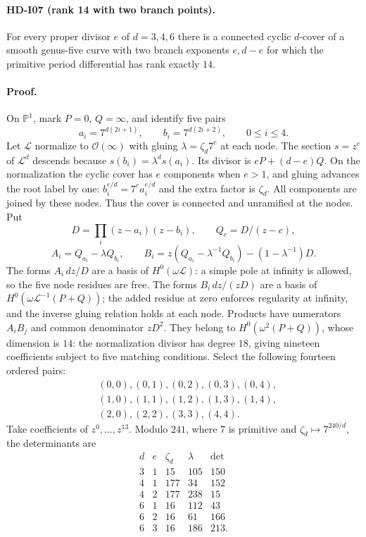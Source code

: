 \paragraph{HD-I07 (rank 14 with two branch points).}
For every proper divisor $e$ of $d=3,4,6$ there is a connected cyclic
$d$-cover of a smooth genus-five curve with two branch exponents
$e,d-e$ for which the primitive period differential has rank exactly
$14$.

\paragraph{Proof.}
On $\mathbb P^1$, mark $P=0$, $Q=\infty$, and identify five pairs
\[
a_i=7^{d(2i+1)},\qquad b_i=7^{d(2i+2)},\qquad 0\le i\le4.
\]
Let $\mathcal L$ normalize to $\mathcal O(\infty)$ with gluing
$\lambda=\zeta_d7^e$ at each node. The section $s=z^e$ of
$\mathcal L^d$ descends because $s(b_i)=\lambda^d s(a_i)$.
Its divisor is $eP+(d-e)Q$. On the normalization the cyclic cover
has $e$ components when $e>1$, and gluing advances the root label by
one: $b_i^{e/d}=7^e a_i^{e/d}$ and the extra factor is $\zeta_d$.
All components are joined by these nodes. Thus the cover is connected
and unramified at the nodes.
Put
\[
D=\prod_i(z-a_i)(z-b_i),\qquad Q_c=D/(z-c),
\]
\[
A_i=Q_{a_i}-\lambda Q_{b_i},\qquad
B_i=z(Q_{a_i}-\lambda^{-1}Q_{b_i})-(1-\lambda^{-1})D.
\]
The forms $A_i\,dz/D$ are a basis of $H^0(\omega\mathcal L)$:
a simple pole at infinity is allowed, so the five node residues are
free. The forms $B_i\,dz/(zD)$ are a basis of
$H^0(\omega\mathcal L^{-1}(P+Q))$; the added residue at zero enforces
regularity at infinity, and the inverse gluing relation holds at each
node. Products have numerators $A_iB_j$ and common denominator $zD^2$.
They belong to $H^0(\omega^2(P+Q))$, whose dimension is $14$:
the normalization divisor has degree $18$, giving nineteen
coefficients subject to five matching conditions.
Select the following fourteen ordered pairs:
\[
\begin{split}
&(0,0),(0,1),(0,2),(0,3),(0,4),\\
&(1,0),(1,1),(1,2),(1,3),(1,4),\\
&(2,0),(2,2),(3,3),(4,4).
\end{split}
\]
Take coefficients of $z^0,\ldots,z^{13}$. Modulo $241$, where $7$ is
primitive and $\zeta_d\mapsto7^{240/d}$, the determinants are
\[
\begin{array}{cc|rrr}
d&e&\zeta_d&\lambda&\det\\\hline
3&1&15&105&150\\
4&1&177&34&152\\
4&2&177&238&15\\
6&1&16&112&43\\
6&2&16&61&166\\
6&3&16&186&213.
\end{array}
\]
